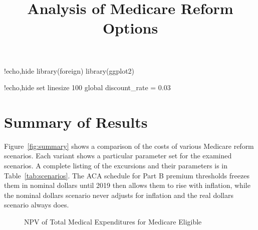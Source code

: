 \documentclass{article}
\title{Analysis of Medicare Reform Options}
\begin{document}
\maketitle
\listoftables
\listoffigures

\begin{Rcode}{!echo,hide}
library(foreign)
library(ggplot2)
\end{Rcode}

\begin{Statacode}{!echo,hide}
set linesize 100
global discount_rate = 0.03
\end{Statacode}

\section{Summary of Results}

Figure~\ref{fig:summary} shows a comparison of the costs of various Medicare reform scenarios. Each variant shows a particular parameter set for the examined scenarios. A complete listing of the excursions and their parameters is in Table~\ref{tab:scenarios}. The ACA schedule for Part B premium thresholds freezes them in nominal dollars until 2019 then allows them to rise with inflation, while the nominal dollars scenario never adjusts for inflation and the real dollars scenario always does.


\begin{figure}
\centering
{}
\caption{NPV of Total Medical Expenditures for Medicare Eligible}
\end{figure}
\end{document}
